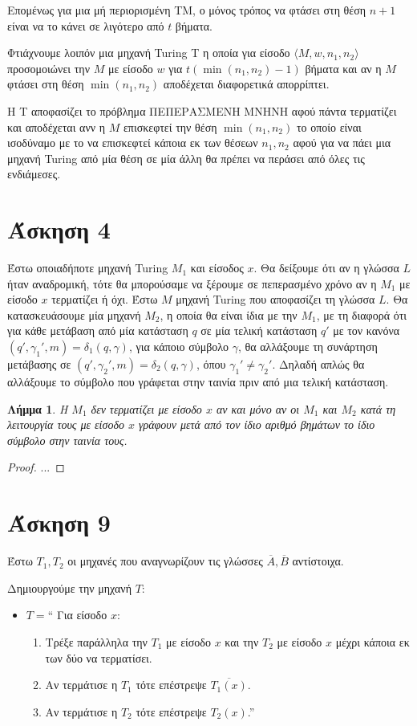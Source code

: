 \documentclass[a4paper, oneside, 11pt]{article}
\newtheorem{lm}[thm]{Λήμμα}
\theoremstyle{definition}
\begin{document}
Επομένως για μια μή περιορισμένη TM, ο μόνος τρόπος να φτάσει στη θέση $n+1$ είναι να
το κάνει σε λιγότερο από $t$ βήματα.

Φτιάχνουμε λοιπόν μια μηχανή Turing T η οποία για είσοδο $\langle M, w, n_1, n_2
\rangle$ προσομοιώνει την $M$ με είσοδο $w$ για $t(\min(n_1, n_2)-1)$ βήματα και αν η
$M$ φτάσει στη θέση $\min(n_1, n_2)$ αποδέχεται διαφορετικά απορρίπτει.

Η T αποφασίζει το πρόβλημα ΠΕΠΕΡΑΣΜΕΝΗ ΜΝΗΝΗ αφού πάντα τερματίζει και αποδέχεται ανν
η $M$ επισκεφτεί την θέση $\min(n_1, n_2)$ το οποίο είναι ισοδύναμο με το να
επισκεφτεί κάποια εκ των θέσεων $n_1, n_2$ αφού για να πάει μια μηχανή Turing από μία
θέση σε μία άλλη θα πρέπει να περάσει από όλες τις ενδιάμεσες.

\section*{Άσκηση 4}

Έστω οποιαδήποτε μηχανή Turing $M_1$ και είσοδος $x$. Θα δείξουμε ότι αν η γλώσσα $L$ ήταν αναδρομική,
τότε θα μπορούσαμε να ξέρουμε σε πεπερασμένο χρόνο αν η $M_1$ με είσοδο $x$ τερματίζει ή όχι.
Έστω $M$ μηχανή Turing που αποφασίζει τη γλώσσα $L$. Θα κατασκευάσουμε μία μηχανή $M_2$, η οποία θα είναι
ίδια με την $M_1$, με τη διαφορά ότι για κάθε μετάβαση από μία κατάσταση $q$ σε μία τελική κατάσταση $q'$ 
με τον κανόνα $(q',\gamma_1',m)=\delta_1(q,\gamma)$, για κάποιο σύμβολο $\gamma$, θα αλλάξουμε τη συνάρτηση
μετάβασης σε $(q',\gamma_2',m)=\delta_2(q,\gamma)$, όπου $\gamma_1'\neq \gamma_2'$. Δηλαδή απλώς θα αλλάξουμε το σύμβολο που γράφεται
στην ταινία πριν από μια τελική κατάσταση.
\begin{lm}
Η $M_1$ δεν τερματίζει με είσοδο $x$ αν και μόνο αν οι $M_1$ και $M_2$ κατά τη λειτουργία τους με είσοδο
$x$ γράφουν μετά από τον ίδιο αριθμό βημάτων το ίδιο σύμβολο στην ταινία τους.
\end{lm}
\begin{proof}
...
\end{proof}

\section*{Άσκηση 9}

Έστω $T_1, T_2$ οι μηχανές που αναγνωρίζουν τις γλώσσες $\overline{A}, \overline{B}$
αντίστοιχα.

Δημιουργούμε την μηχανή $T$:

\begin{itemize}
\item $T = $`` Για είσοδο $x$:
      \begin{enumerate}
         \item Τρέξε παράλληλα την $T_1$ με είσοδο $x$ και την $T_2$ με είσοδο $x$
               μέχρι κάποια εκ των δύο να τερματίσει.
         \item Αν τερμάτισε η $T_1$ τότε επέστρεψε $\overline{T_1(x)}$.
         \item Αν τερμάτισε η $T_2$ τότε επέστρεψε $T_2(x)$.''
      \end{enumerate}
\end{itemize}
\end{document}
